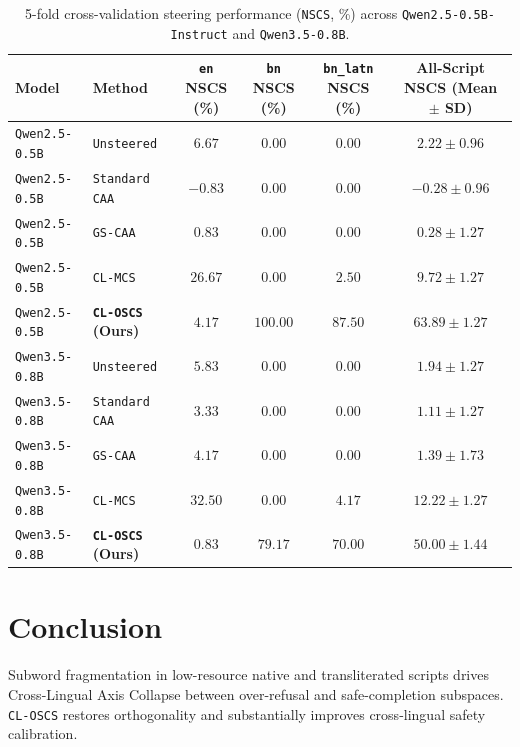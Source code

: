 \documentclass[11pt,a4paper]{article}
\begin{document}
\begin{table}[t]
\centering
\small
\begin{tabular}{llcccc}
\toprule
\textbf{Model} & \textbf{Method} & \textbf{\texttt{en} NSCS (\%)} & \textbf{\texttt{bn} NSCS (\%)} & \textbf{\texttt{bn\_latn} NSCS (\%)} & \textbf{All-Script NSCS (Mean $\pm$ SD)} \\
\midrule
\texttt{Qwen2.5-0.5B} & \texttt{Unsteered} & $6.67$ & $0.00$ & $0.00$ & $2.22 \pm 0.96$ \\
\texttt{Qwen2.5-0.5B} & \texttt{Standard CAA} & $-0.83$ & $0.00$ & $0.00$ & $-0.28 \pm 0.96$ \\
\texttt{Qwen2.5-0.5B} & \texttt{GS-CAA} & $0.83$ & $0.00$ & $0.00$ & $0.28 \pm 1.27$ \\
\texttt{Qwen2.5-0.5B} & \texttt{CL-MCS} & $26.67$ & $0.00$ & $2.50$ & $9.72 \pm 1.27$ \\
\texttt{Qwen2.5-0.5B} & \textbf{\texttt{CL-OSCS} (Ours)} & $\mathbf{4.17}$ & $\mathbf{100.00}$ & $\mathbf{87.50}$ & $\mathbf{63.89 \pm 1.27}$ \\
\midrule
\texttt{Qwen3.5-0.8B} & \texttt{Unsteered} & $5.83$ & $0.00$ & $0.00$ & $1.94 \pm 1.27$ \\
\texttt{Qwen3.5-0.8B} & \texttt{Standard CAA} & $3.33$ & $0.00$ & $0.00$ & $1.11 \pm 1.27$ \\
\texttt{Qwen3.5-0.8B} & \texttt{GS-CAA} & $4.17$ & $0.00$ & $0.00$ & $1.39 \pm 1.73$ \\
\texttt{Qwen3.5-0.8B} & \texttt{CL-MCS} & $32.50$ & $0.00$ & $4.17$ & $12.22 \pm 1.27$ \\
\texttt{Qwen3.5-0.8B} & \textbf{\texttt{CL-OSCS} (Ours)} & $\mathbf{0.83}$ & $\mathbf{79.17}$ & $\mathbf{70.00}$ & $\mathbf{50.00 \pm 1.44}$ \\
\bottomrule
\end{tabular}
\caption{5-fold cross-validation steering performance (\texttt{NSCS}, \%) across \texttt{Qwen2.5-0.5B-Instruct} and \texttt{Qwen3.5-0.8B}.}
\label{tab:steering}
\end{table}

\section{Conclusion}
Subword fragmentation in low-resource native and transliterated scripts drives Cross-Lingual Axis Collapse between over-refusal and safe-completion subspaces. \texttt{CL-OSCS} restores orthogonality and substantially improves cross-lingual safety calibration.
\end{document}
